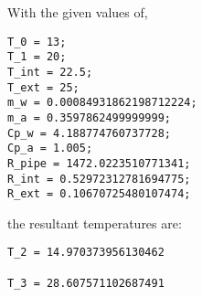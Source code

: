 \documentclass[12pt]{report}
\begin{document}
With the given values of,
\begin{lstlisting}
T_0 = 13;
T_1 = 20;
T_int = 22.5;
T_ext = 25;
m_w = 0.00084931862198712224;
m_a = 0.3597862499999999;
Cp_w = 4.188774760737728;
Cp_a = 1.005; 
R_pipe = 1472.0223510771341;
R_int = 0.52972312781694775;
R_ext = 0.10670725480107474;
\end{lstlisting}
the resultant temperatures are:
\begin{lstlisting}
T_2 = 14.970373956130462

T_3 = 28.607571102687491
\end{lstlisting}


        
\end{document}
